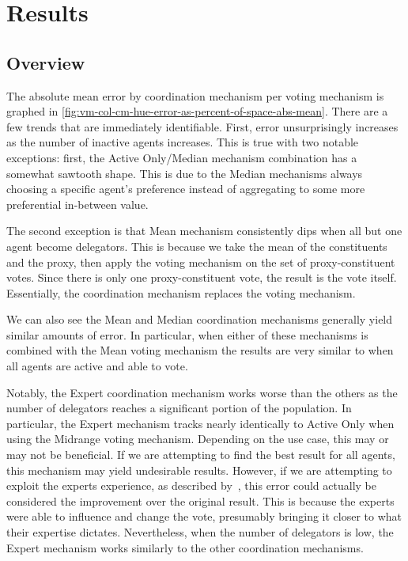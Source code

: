 \section{Results}\label{sec:results}

\subsection{Overview}\label{subsec:results-overview}
The absolute mean error by coordination mechanism per voting mechanism is graphed in
\autoref{fig:vm-col-cm-hue-error-as-percent-of-space-abs-mean}.
There are a few trends that are immediately identifiable.
First, error unsurprisingly increases as the number of inactive agents increases.
This is true with two notable exceptions: first, the Active Only/Median
mechanism combination has a somewhat sawtooth shape.
This is due to the Median mechanisms always choosing a specific agent's preference
instead of aggregating to some more preferential in-between value.

The second exception is that Mean mechanism consistently dips when all but one agent
become delegators.
This is because we take the mean of the constituents and the proxy, then apply the
voting mechanism on the set of proxy-constituent votes.
Since there is only one proxy-constituent vote, the result is the vote itself.
Essentially, the coordination mechanism replaces the voting mechanism.

We can also see the Mean and Median coordination mechanisms generally yield similar
amounts of error.
In particular, when either of these mechanisms is combined with the Mean voting
mechanism the results are very similar to when all agents are active and able to vote.

Notably, the Expert coordination mechanism works worse than the others as the number
of delegators reaches a significant portion of the population.
In particular, the Expert mechanism tracks nearly identically to Active Only when
using the Midrange voting mechanism.
Depending on the use case, this may or may not be beneficial.
If we are attempting to find the best result for all agents, this mechanism may yield
undesirable results.
However, if we are attempting to exploit the experts experience, as described
by~\cite{Miller1969}, this error could actually be considered the improvement over
the original result.
This is because the experts were able to influence and change the vote, presumably
bringing it closer to what their expertise dictates.
Nevertheless, when the number of delegators is low, the Expert mechanism works
similarly to the other coordination mechanisms.

